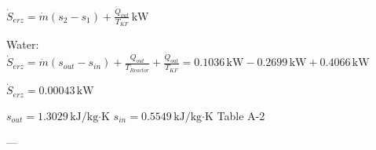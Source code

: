 \( \dot{S}_{erz} = \dot{m} (s_2 - s_1) + \frac{\dot{Q}_{out}}{T_{KF}} \, \text{kW} \)  

Water:  
\( \dot{S}_{erz} = \dot{m} (s_{out} - s_{in}) + \frac{\dot{Q}_{out}}{T_{Reactor}} + \frac{\dot{Q}_{out}}{T_{KF}} = 0.1036 \, \text{kW} - 0.2699 \, \text{kW} + 0.4066 \, \text{kW} \)  

\( \dot{S}_{erz} = 0.00043 \, \text{kW} \)  

\( s_{out} = 1.3029 \, \text{kJ/kg·K} \)  
\( s_{in} = 0.5549 \, \text{kJ/kg·K} \)  
Table A-2  

---